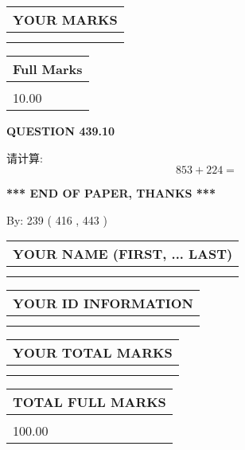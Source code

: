 \documentclass{ctexart}
\begin{document}
\vspace{0.2in}
  
\noindent\begin{tabular}{|l|}
\hline
 YOUR MARKS  \\
\hline
 \\ 
 \\ 
\hline
\end{tabular}
\hspace{0.05in} \begin{tabular}{|l|}
\hline
 Full Marks  \\
\hline
 \\ 
10.00 \\
\hline
\end{tabular}
{\textbf{\Large{QUESTION
439.10 
}}}
  
  
 
请计算:
\begin{equation}
853 +  %
224 = \nonumber
\end{equation}
 

 

 
   
   
 \vspace{0.2in}
 
   
   
   
   
\vspace{1.0in} 
{\textbf{\large{ *** END OF PAPER, THANKS *** }}} 
   
   
\hspace{1.0in} By: 
 239 ( 416 ,  443 )
   
   
   
   
\newpage 
\setcounter{page}{ 
   440001 } 
   
   
   
   
\noindent\begin{tabular}{|l|}
\hline
YOUR NAME (FIRST, ... LAST)  \\
\hline
 \\ 
 \\ 
\hline
\end{tabular}
\hspace{0.05in} \begin{tabular}{|l|}
\hline
 YOUR   ID   INFORMATION  \\
\hline
 \\ 
 \\ 
\hline
\end{tabular}
   
   
\vspace{0.2in}\noindent\begin{tabular}{|l|}
\hline
YOUR TOTAL MARKS  \\
\hline
 \\ 
 \\ 
\hline
\end{tabular}
\hspace{0.05in} \begin{tabular}{|l|}
\hline
TOTAL FULL MARKS  \\
\hline
 \\ 
100.00 \\
\hline
\end{tabular}
   
\end{document}
